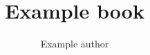 \documentclass[lang=hu]{math-book}
\title{Example book}
\author{Example author}
\begin{document}
\frontmatter

\begin{titlepage}
  \maketitle
\end{titlepage}

\tableofcontents

\mainmatter



\end{document}
